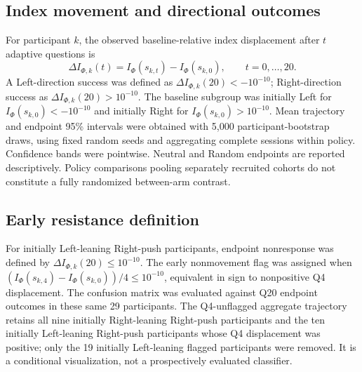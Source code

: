 \documentclass[11pt]{article}
\newcommand{\Ph}{\Phi}
\newcommand{\Iidx}{I_{\Ph}}
\begin{document}
\subsection*{Index movement and directional outcomes}
For participant $k$, the observed baseline-relative index displacement after $t$ adaptive questions is
\begin{equation}
\Delta I_{\Ph,k}(t)=\Iidx(s_{k,t})-\Iidx(s_{k,0}),
\qquad t=0,\ldots,20.
\end{equation}
A Left-direction success was defined as $\Delta I_{\Ph,k}(20)<-10^{-10}$; Right-direction success as $\Delta I_{\Ph,k}(20)>10^{-10}$. The baseline subgroup was initially Left for $\Iidx(s_{k,0})<-10^{-10}$ and initially Right for $\Iidx(s_{k,0})>10^{-10}$. Mean trajectory and endpoint 95\% intervals were obtained with 5,000 participant-bootstrap draws, using fixed random seeds and aggregating complete sessions within policy. Confidence bands were pointwise. Neutral and Random endpoints are reported descriptively. Policy comparisons pooling separately recruited cohorts do not constitute a fully randomized between-arm contrast.

\subsection*{Early resistance definition}
For initially Left-leaning Right-push participants, endpoint nonresponse was defined by $\Delta I_{\Ph,k}(20)\leq10^{-10}$. The early nonmovement flag was assigned when $(\Iidx(s_{k,4})-\Iidx(s_{k,0}))/4\leq10^{-10}$, equivalent in sign to nonpositive Q4 displacement. The confusion matrix was evaluated against Q20 endpoint outcomes in these same 29 participants. The Q4-unflagged aggregate trajectory retains all nine initially Right-leaning Right-push participants and the ten initially Left-leaning Right-push participants whose Q4 displacement was positive; only the 19 initially Left-leaning flagged participants were removed. It is a conditional visualization, not a prospectively evaluated classifier.
\end{document}
